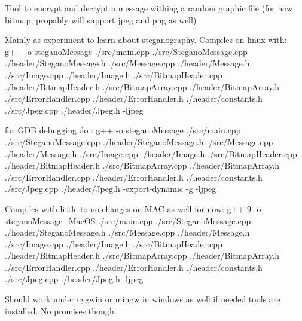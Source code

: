 Tool to encrypt and decrypt a message withing a random graphic file (for now bitmap, propably will support jpeg and png as well)

Mainly as experiment to learn about steganography. Compiles on linux with\+: g++ -\/o stegano\+Message ./src/main.cpp ./src/\+Stegano\+Message.cpp ./header/\+Stegano\+Message.h ./src/\+Message.cpp ./header/\+Message.h ./src/\+Image.cpp ./header/\+Image.h ./src/\+Bitmap\+Header.cpp ./header/\+Bitmap\+Header.h ./src/\+Bitmap\+Array.cpp ./header/\+Bitmap\+Array.h ./src/\+Error\+Handler.cpp ./header/\+Error\+Handler.h ./header/constants.h ./src/\+Jpeg.cpp ./header/\+Jpeg.h -\/ljpeg

for G\+DB debugging do \+: g++ -\/o stegano\+Message ./src/main.cpp ./src/\+Stegano\+Message.cpp ./header/\+Stegano\+Message.h ./src/\+Message.cpp ./header/\+Message.h ./src/\+Image.cpp ./header/\+Image.h ./src/\+Bitmap\+Header.cpp ./header/\+Bitmap\+Header.h ./src/\+Bitmap\+Array.cpp ./header/\+Bitmap\+Array.h ./src/\+Error\+Handler.cpp ./header/\+Error\+Handler.h ./header/constants.h ./src/\+Jpeg.cpp ./header/\+Jpeg.h -\/export-\/dynamic -\/g -\/ljpeg

Compiles with little to no changes on M\+AC as well for now\+: g++-\/9 -\/o stegano\+Message\+\_\+\+Mac\+OS ./src/main.cpp ./src/\+Stegano\+Message.cpp ./header/\+Stegano\+Message.h ./src/\+Message.cpp ./header/\+Message.h ./src/\+Image.cpp ./header/\+Image.h ./src/\+Bitmap\+Header.cpp ./header/\+Bitmap\+Header.h ./src/\+Bitmap\+Array.cpp ./header/\+Bitmap\+Array.h ./src/\+Error\+Handler.cpp ./header/\+Error\+Handler.h ./header/constants.h ./src/\+Jpeg.cpp ./header/\+Jpeg.h -\/ljpeg

Should work under cygwin or mingw in windows as well if needed tools are installed. No promises though. 